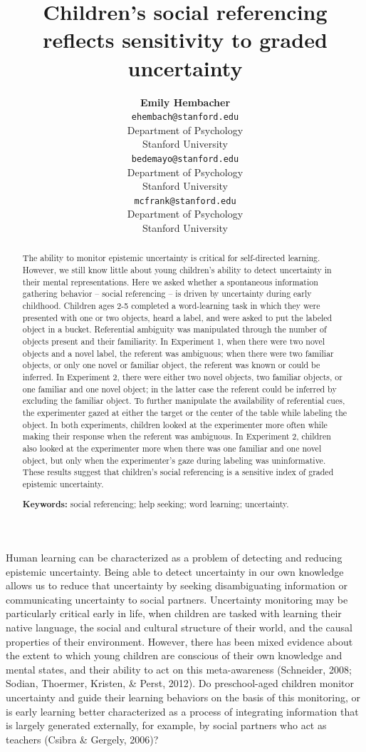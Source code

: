 \documentclass[10pt, letterpaper]{article}
\title{Children's social referencing reflects sensitivity to graded uncertainty}
\author{{\large \bf Emily  Hembacher} \\ \texttt{ehembach@stanford.edu} \\ Department of Psychology \\ Stanford University \And {\large \bf Benjamin deMayo} \\ \texttt{bedemayo@stanford.edu} \\ Department of Psychology \\ Stanford University \And {\large \bf Michael C. Frank} \\ \texttt{mcfrank@stanford.edu} \\ Department of Psychology \\ Stanford University}
\begin{document}
\maketitle

\begin{abstract}
The ability to monitor epistemic uncertainty is critical for
self-directed learning. However, we still know little about young
children's ability to detect uncertainty in their mental
representations. Here we asked whether a spontaneous information
gathering behavior -- social referencing -- is driven by uncertainty
during early childhood. Children ages 2-5 completed a word-learning task
in which they were presented with one or two objects, heard a label, and
were asked to put the labeled object in a bucket. Referential ambiguity
was manipulated through the number of objects present and their
familiarity. In Experiment 1, when there were two novel objects and a
novel label, the referent was ambiguous; when there were two familiar
objects, or only one novel or familiar object, the referent was known or
could be inferred. In Experiment 2, there were either two novel objects,
two familiar objects, or one familiar and one novel object; in the
latter case the referent could be inferred by excluding the familiar
object. To further manipulate the availability of referential cues, the
experimenter gazed at either the target or the center of the table while
labeling the object. In both experiments, children looked at the
experimenter more often while making their response when the referent
was ambiguous. In Experiment 2, children also looked at the experimenter
more when there was one familiar and one novel object, but only when the
experimenter's gaze during labeling was uninformative. These results
suggest that children's social referencing is a sensitive index of
graded epistemic uncertainty.

\textbf{Keywords:}
social referencing; help seeking; word learning; uncertainty.
\end{abstract}

Human learning can be characterized as a problem of detecting and
reducing epistemic uncertainty. Being able to detect uncertainty in our
own knowledge allows us to reduce that uncertainty by seeking
disambiguating information or communicating uncertainty to social
partners. Uncertainty monitoring may be particularly critical early in
life, when children are tasked with learning their native language, the
social and cultural structure of their world, and the causal properties
of their environment. However, there has been mixed evidence about the
extent to which young children are conscious of their own knowledge and
mental states, and their ability to act on this meta-awareness
(Schneider, 2008; Sodian, Thoermer, Kristen, \& Perst, 2012). Do
preschool-aged children monitor uncertainty and guide their learning
behaviors on the basis of this monitoring, or is early learning better
characterized as a process of integrating information that is largely
generated externally, for example, by social partners who act as
teachers (Csibra \& Gergely, 2006)?
\end{document}
